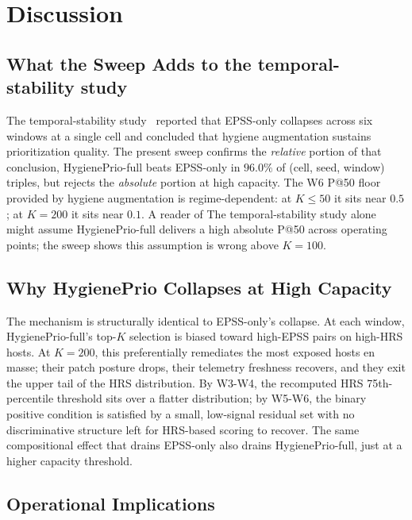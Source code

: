 \section{Discussion}

\subsection{What the Sweep Adds to the temporal-stability study}

The temporal-stability study~\cite{paper5temporal} reported that EPSS-only collapses across
six windows at a single cell and concluded that hygiene augmentation
sustains prioritization quality. The present sweep confirms the
\textit{relative} portion of that conclusion, HygienePrio-full beats
EPSS-only in $96.0\%$ of (cell, seed, window) triples, but rejects
the \textit{absolute} portion at high capacity. The W6 P@50 floor
provided by hygiene augmentation is regime-dependent: at $K \leq 50$
it sits near $0.5$; at $K = 200$ it sits near $0.1$. A reader of
The temporal-stability study alone might assume HygienePrio-full delivers a high absolute
P@50 across operating points; the sweep shows this assumption is wrong
above $K = 100$.

\subsection{Why HygienePrio Collapses at High Capacity}

The mechanism is structurally identical to EPSS-only's collapse. At
each window, HygienePrio-full's top-$K$ selection is biased toward
high-EPSS pairs on high-HRS hosts. At $K = 200$, this preferentially
remediates the most exposed hosts en masse; their patch posture drops,
their telemetry freshness recovers, and they exit the
upper tail of the HRS distribution. By W3-W4, the recomputed HRS
75th-percentile threshold sits over a flatter distribution; by W5-W6,
the binary positive condition is satisfied by a small, low-signal
residual set with no discriminative structure left for HRS-based
scoring to recover. The same compositional effect that drains EPSS-only
also drains HygienePrio-full, just at a higher capacity threshold.

\subsection{Operational Implications}

